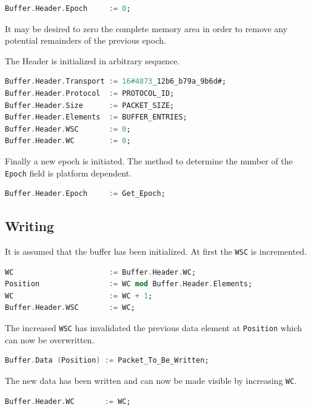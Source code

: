 \documentclass[a4paper,twoside,titlepage]{article}
\begin{document}
\begin{lstlisting}[language=Ada]
Buffer.Header.Epoch     := 0;
\end{lstlisting}

It may be desired to zero the complete memory area in order to remove any
potential remainders of the previous epoch.

The Header is initialized in arbitrary sequence.

\begin{lstlisting}[firstnumber=last,language=Ada]
Buffer.Header.Transport := 16#4873_12b6_b79a_9b6d#;
Buffer.Header.Protocol  := PROTOCOL_ID;
Buffer.Header.Size      := PACKET_SIZE;
Buffer.Header.Elements  := BUFFER_ENTRIES;
Buffer.Header.WSC       := 0;
Buffer.Header.WC        := 0;
\end{lstlisting}

Finally a new epoch is initiated. The method to determine the number of the
\texttt{Epoch} field is platform dependent.

\begin{lstlisting}[firstnumber=last,language=Ada]
Buffer.Header.Epoch     := Get_Epoch;
\end{lstlisting}

\subsection{Writing}

It is assumed that the buffer has been initialized.
At first the \texttt{WSC} is incremented.

\begin{lstlisting}[language=Ada]
WC                      := Buffer.Header.WC;
Position                := WC mod Buffer.Header.Elements;
WC                      := WC + 1;
Buffer.Header.WSC       := WC;
\end{lstlisting}

The increased \texttt{WSC} has invalidated the previous data
element at \texttt{Position} which can now be overwritten.

\begin{lstlisting}[firstnumber=last,language=Ada]
Buffer.Data (Position) := Packet_To_Be_Written;
\end{lstlisting}

The new data has been written and can now be made visible by increasing \texttt{WC}.

\begin{lstlisting}[firstnumber=last,language=Ada]
Buffer.Header.WC       := WC;
\end{lstlisting}
\end{document}
